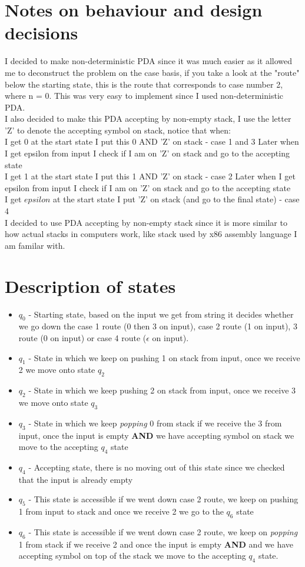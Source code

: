 \documentclass{report}[pt12]
\begin{document}
\section{Notes on behaviour and design decisions}
I decided to make non-deterministic PDA since it was much easier as it allowed me to deconstruct the problem on the case basis, if you take a look at the "route" below the starting state, this is the route that corresponds to case number 2, where n = 0. This was very easy to implement since I used non-deterministic PDA.
\\
I also decided to make this PDA accepting by non-empty stack, I use the letter 'Z' to denote the accepting symbol on stack, notice that when: \\
I get 0 at the start state I put this 0 AND 'Z' on stack - case 1 and 3
Later when I get epsilon from input I check if I am on 'Z' on stack and go to the accepting state \\
I get 1 at the start state I put this 1 AND 'Z' on stack - case 2
Later when I get epsilon from input I check if I am on 'Z' on stack and go to the accepting state \\
I get $epsilon$ at the start state I put 'Z' on stack (and go to the final state) - case 4 \\
I decided to use PDA accepting by non-empty stack since it is more similar to how actual stacks in computers work, like stack used by x86 assembly language I am familar with.

\section{Description of states}
\begin{itemize}
\item $q_0$ - Starting state, based on the input we get from string it decides whether we go down the case 1 route (0 then 3 on input), case 2 route (1 on input), 3 route (0 on input) or case 4 route ($\epsilon$ on input).
\item $q_1$ - State in which we keep on pushing 1 on stack from input, once we receive 2 we move onto state $q_2$
\item $q_2$ - State in which we keep pushing 2 on stack from input, once we receive 3 we move onto state $q_3$
\item $q_3$ - State in which we keep \emph{popping} 0 from stack if we receive the 3 from input, once the input is empty \textbf{AND} we have accepting symbol on stack we move to the accepting $q_4$ state
\item $q_4$ - Accepting state, there is no moving out of this state since we checked that the input is already empty
\item $q_5$ - This state is accessible if we went down case 2 route, we keep on pushing 1 from input to stack and once we receive 2 we go to the $q_6$ state
\item $q_6$ - This state is accessible if we went down case 2 route, we keep on \emph{popping} 1 from stack if we receive 2 and once the input is empty \textbf{AND} and we have accepting symbol on top of the stack we move to the accepting $q_4$ state.
\end{itemize}
\end{document}
